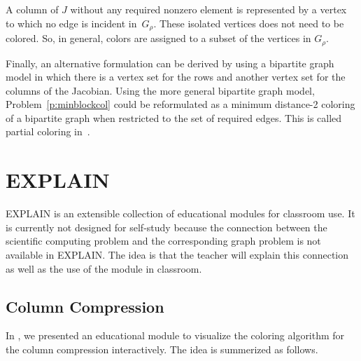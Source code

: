\documentclass[12pt, oneside]{book}
\newcommand{\sparsifysymbol}{\ensuremath{\rho}}
\begin{document}
A column of $J$ without any required nonzero element is represented by a vertex to which
no edge is incident in~$G_\sparsifysymbol$. These isolated vertices does not need to be
colored. So, in general, colors are assigned to a subset of the vertices in
$G_\sparsifysymbol$.

Finally, an alternative formulation can be derived by using a bipartite graph model in
which there is a vertex set for the rows and another vertex set for the columns of the
Jacobian. Using the more general bipartite graph model, Problem~\ref{p:minblockcol} could
be reformulated as a minimum distance-2 coloring of a bipartite graph when restricted to
the set of required edges. This is called partial coloring in~\cite{Gebremedhin05whatcolor}.

\chapter{EXPLAIN}
\label{explain}

\mbox{EXPLAIN} is an extensible collection of educational modules for classroom use.
It is currently not designed for self-study because the connection between the scientific computing problem and the corresponding graph problem is not available in \mbox{EXPLAIN}. The idea is that the teacher will explain this connection as well as the use of the module in classroom.


\section{Column Compression}
\label{s.column-compression}
In \cite{2013:05,2014:01}, we presented an educational module to visualize the
coloring algorithm for the column compression interactively. The idea is 
summerized as follows.
\end{document}
